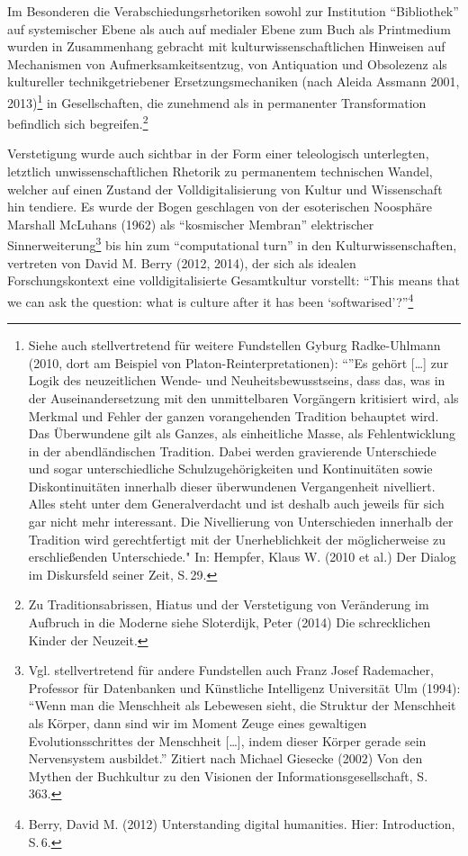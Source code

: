 \documentclass[a4paper,
fontsize=11pt,
oneside,
numbers=noperiodatend,
parskip=half-,
bibliography=totoc,
final
]{scrartcl}
\begin{document}
Im Besonderen die Verabschiedungsrhetoriken sowohl zur Institution
\enquote{Bibliothek} auf systemischer Ebene als auch auf medialer Ebene
zum Buch als Printmedium wurden in Zusammenhang gebracht mit
kulturwissenschaftlichen Hinweisen auf Mechanismen von
Aufmerksamkeitsentzug, von Antiquation und Obsolezenz als kultureller
technikgetriebener Ersetzungsmechaniken (nach Aleida Assmann 2001,
2013)\footnote{Siehe auch stellvertretend für weitere Fundstellen Gyburg
  Radke-Uhlmann (2010, dort am Beispiel von Platon-Reinterpretationen):
  \enquote{}Es gehört {[}\ldots{}{]} zur Logik des neuzeitlichen Wende-
  und Neuheitsbewusstseins, dass das, was in der Auseinandersetzung mit
  den unmittelbaren Vorgängern kritisiert wird, als Merkmal und Fehler
  der ganzen vorangehenden Tradition behauptet wird. Das Überwundene
  gilt als Ganzes, als einheitliche Masse, als Fehlentwicklung in der
  abendländischen Tradition. Dabei werden gravierende Unterschiede und
  sogar unterschiedliche Schulzugehörigkeiten und Kontinuitäten sowie
  Diskontinuitäten innerhalb dieser überwundenen Vergangenheit
  nivelliert. Alles steht unter dem Generalverdacht und ist deshalb auch
  jeweils für sich gar nicht mehr interessant. Die Nivellierung von
  Unterschieden innerhalb der Tradition wird gerechtfertigt mit der
  Unerheblichkeit der möglicherweise zu erschließenden Unterschiede."
  In: Hempfer, Klaus W. (2010 et al.) Der Dialog im Diskursfeld seiner
  Zeit, S.\,29.} in Gesellschaften, die zunehmend als in permanenter
Transformation befindlich sich begreifen.\footnote{Zu
  Traditionsabrissen, Hiatus und der Verstetigung von Veränderung im
  Aufbruch in die Moderne siehe Sloterdijk, Peter (2014) Die
  schrecklichen Kinder der Neuzeit.}

Verstetigung wurde auch sichtbar in der Form einer teleologisch
unterlegten, letztlich unwissenschaftlichen Rhetorik zu permanentem
technischen Wandel, welcher auf einen Zustand der Volldigitalisierung
von Kultur und Wissenschaft hin tendiere. Es wurde der Bogen geschlagen
von der esoterischen Noosphäre Marshall McLuhans (1962) als
\enquote{kosmischer Membran} elektrischer Sinnerweiterung\footnote{Vgl.
  stellvertretend für andere Fundstellen auch Franz Josef Rademacher,
  Professor für Datenbanken und Künstliche Intelligenz Universität Ulm
  (1994): \enquote{Wenn man die Menschheit als Lebewesen sieht, die
  Struktur der Menschheit als Körper, dann sind wir im Moment Zeuge
  eines gewaltigen Evolutionsschrittes der Menschheit {[}\ldots{}{]},
  indem dieser Körper gerade sein Nervensystem ausbildet.} Zitiert nach
  Michael Giesecke (2002) Von den Mythen der Buchkultur zu den Visionen
  der Informationsgesellschaft, S.\,363.} bis hin zum
\enquote{computational turn} in den Kulturwissenschaften, vertreten von
David M. Berry (2012, 2014), der sich als idealen Forschungskontext eine
volldigitalisierte Gesamtkultur vorstellt: \enquote{This means that we
can ask the question: what is culture after it has been
\enquote{softwarised}?}\footnote{Berry, David M. (2012) Unterstanding
  digital humanities. Hier: Introduction, S.\,6.}
\end{document}
